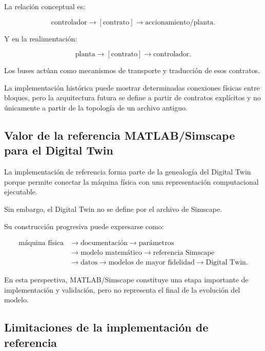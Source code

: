 La relación conceptual es:

\begin{equation}
\text{controlador}
\rightarrow
[\text{contrato}]
\rightarrow
\text{accionamiento/planta}.
\end{equation}

Y en la realimentación:

\begin{equation}
\text{planta}
\rightarrow
[\text{contrato}]
\rightarrow
\text{controlador}.
\end{equation}

Los buses actúan como mecanismos de transporte y traducción de esos contratos.

La implementación histórica puede mostrar determinadas conexiones físicas entre bloques, pero la arquitectura futura se define a partir de contratos explícitos y no únicamente a partir de la topología de un archivo antiguo.

\subsection{Valor de la referencia MATLAB/Simscape para el Digital Twin}

La implementación de referencia forma parte de la genealogía del Digital Twin porque permite conectar la máquina física con una representación computacional ejecutable.

Sin embargo, el Digital Twin no se define por el archivo de Simscape.

Su construcción progresiva puede expresarse como:

\begin{equation}
\begin{aligned}
\text{máquina física}
&\rightarrow \text{documentación}
\rightarrow \text{parámetros}
\\
&\rightarrow \text{modelo matemático}
\rightarrow \text{referencia Simscape}
\\
&\rightarrow \text{datos}
\rightarrow \text{modelos de mayor fidelidad}
\rightarrow \text{Digital Twin}.
\end{aligned}
\end{equation}

En esta perspectiva, MATLAB/Simscape constituye una etapa importante de implementación y validación, pero no representa el final de la evolución del modelo.

\subsection{Limitaciones de la implementación de referencia}

